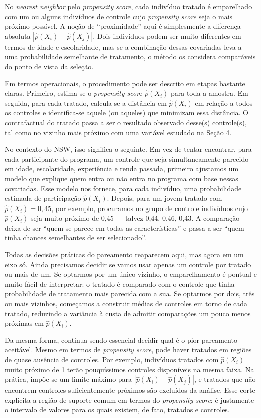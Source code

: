 No \textit{nearest neighbor} pelo \textit{propensity score}, cada indivíduo tratado é emparelhado com um ou alguns indivíduos de controle cujo \textit{propensity score} seja o mais próximo possível. A noção de “proximidade” aqui é simplesmente a diferença absoluta $|\hat{p}(X_i) - \hat{p}(X_j)|$. Dois indivíduos podem ser muito diferentes em termos de idade e escolaridade, mas se a combinação dessas covariadas leva a uma probabilidade semelhante de tratamento, o método os considera comparáveis do ponto de vista da seleção.

Em termos operacionais, o procedimento pode ser descrito em etapas bastante claras. Primeiro, estima-se o \textit{propensity scor}e $\hat{p}(X_i)$ para toda a amostra. Em seguida, para cada tratado, calcula-se a distância em $\hat{p}(X_i)$ em relação a todos os controles e identifica-se aquele (ou aqueles) que minimizam essa distância. O contrafactual do tratado passa a ser o resultado observado desse(s) controle(s), tal como no vizinho mais próximo com uma variável estudado na Seção 4.

No contexto do NSW, isso significa o seguinte. Em vez de tentar encontrar, para cada participante do programa, um controle que seja simultaneamente parecido em idade, escolaridade, experiência e renda passada, primeiro ajustamos um modelo que explique quem entra ou não entra no programa com base nessas covariadas. Esse modelo nos fornece, para cada indivíduo, uma probabilidade estimada de participação $\hat{p}(X_i)$. Depois, para um jovem tratado com $\hat{p}(X_i) = 0,45$, por exemplo, procuramos no grupo de controle indivíduos cujo $\hat{p}(X_i)$ seja muito próximo de 0,45 — talvez 0,44, 0,46, 0,43. A comparação deixa de ser “quem se parece em todas as características” e passa a ser “quem tinha chances semelhantes de ser selecionado”.

Todas as decisões práticas do pareamento reaparecem aqui, mas agora em um eixo só. Ainda precisamos decidir se vamos usar apenas um controle por tratado ou mais de um. Se optarmos por um único vizinho, o emparelhamento é pontual e muito fácil de interpretar: o tratado é comparado com o controle que tinha probabilidade de tratamento mais parecida com a sua. Se optarmos por dois, três ou mais vizinhos, começamos a construir médias de controles em torno de cada tratado, reduzindo a variância à custa de admitir comparações um pouco menos próximas em $\hat{p}(X_i)$.

Da mesma forma, continua sendo essencial decidir qual é o pior pareamento aceitável. Mesmo em termos de \textit{propensity score}, pode haver tratados em regiões de quase ausência de controles. Por exemplo, indivíduos tratados com $\hat{p}(X_i)$ muito próximo de 1 terão pouquíssimos controles disponíveis na mesma faixa. Na prática, impõe-se um limite máximo para $|\hat{p}(X_i) - \hat{p}(X_j)|$, e tratados que não encontrem controles suficientemente próximos são excluídos da análise. Esse corte explicita a região de suporte comum em termos do \textit{propensity score}: é justamente o intervalo de valores para os quais existem, de fato, tratados e controles.

